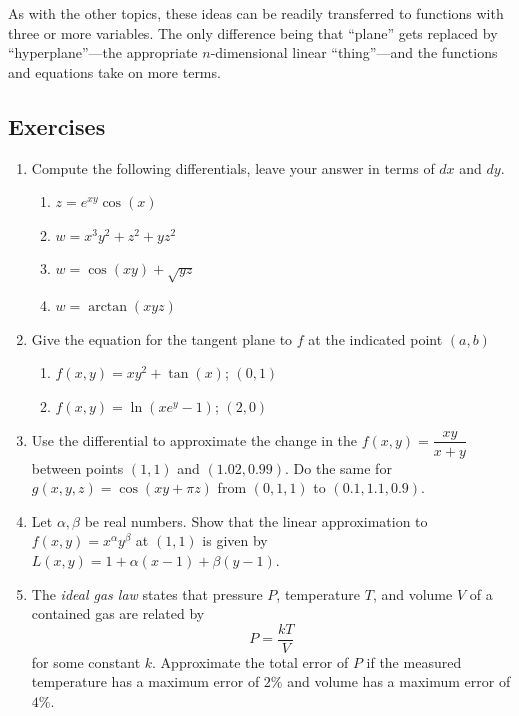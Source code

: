 \documentclass[12pt]{article}
\numberwithin{equation}{subsection}
\numberwithin{figure}{subsection}
\theoremstyle{note}
\begin{document}
{As with the other topics, these ideas can be readily transferred to functions with three or more variables. The only difference being that ``plane'' gets replaced by ``hyperplane''---the appropriate $n$-dimensional linear ``thing''---and the functions and equations take on more terms.

\subsection{Exercises}

\begin{enumerate}[label=\arabic*.]

\item Compute the following differentials, leave your answer in terms of $dx$ and $dy$.
\begin{enumerate}
	\item $z=e^{xy}\cos(x)$
	\item $w=x^3y^2+z^2+yz^2$
	\item $w=\cos(xy)+\sqrt{yz}$
	\item $w=\arctan(xyz)$
\end{enumerate}

\item Give the equation for the tangent plane to $f$ at the indicated point $(a,b)$
\begin{enumerate}
	\item $f(x,y)=xy^2+\tan(x)$; $(0,1)$
	\item $f(x,y)=\ln(xe^y-1)$; $(2,0)$
\end{enumerate}

\item Use the differential to approximate the change in the $f(x,y)=\dfrac{xy}{x+y}$ between points $(1,1)$ and $(1.02,0.99)$. Do the same for $g(x,y,z)=\cos(xy+\pi z)$ from $(0,1,1)$ to $(0.1,1.1,0.9)$.

\item Let $\alpha,\beta$ be real numbers. Show that the linear approximation to $f(x,y)=x^{\alpha}y^{\beta}$ at $(1,1)$ is given by $L(x,y)=1+\alpha(x-1)+\beta(y-1)$.

\item The \textit{ideal gas law} states that pressure $P$, temperature $T$, and volume $V$ of a contained gas are related by \[ P= \dfrac{kT}{V}\] for some constant $k$. Approximate the total error of $P$ if the measured temperature has a maximum error of $2\%$ and volume has a maximum error of $4\%$.



\end{enumerate}}
\end{document}
